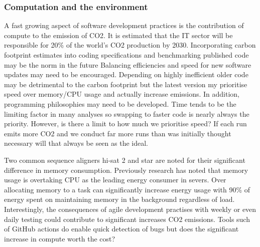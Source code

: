 \documentclass{SBCbookchapter}
\begin{document}




\subsubsection{Computation and the environment}

A fast growing aspect of software development practices is the contribution of compute to the emission of CO2.
It is estimated that the IT sector will be responsible for 20\% of the world's CO2 production by 2030. 
Incorporating carbon footprint estimates into coding specifications and benchmarking published code may be the norm in the future
Balancing efficiencies and speed for new software updates may need to be encouraged.
Depending on highly inefficient older code may be detrimental to the carbon footprint but the latest version my prioritise speed over memory/CPU usage and actually increase emissions.
In addition, programming philosophies may need to be developed. 
Time tends to be the limiting factor in many analyses so swapping to faster code is nearly always the priority. 
However, is there a limit to how much we prioritise speed? 
If each run emits more CO2 and we conduct far more runs than was initially thought necessary will that always be seen as the ideal.

Two common sequence aligners hi-sat 2 and star are noted for their significant difference in memory consumption.
Previously research has noted that memory usage is overtaking CPU as the leading energy consumer in severs.
Over allocating memory to a task can significantly increase energy usage with 90\% of energy spent on maintaining memory in the background regardless of load.
Interestingly, the consequences of agile development practises with weekly or even daily testing could contribute to significant increases CO2 emissions.
Tools such of GitHub actions do enable quick detection of bugs but does the significant increase in compute worth the cost?

\end{document}
